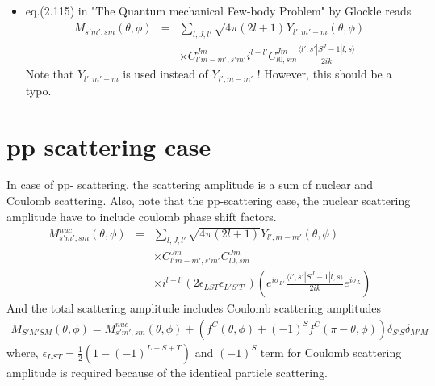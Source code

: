\documentclass[10pt]{book}
\newcommand{\bea}{\begin{eqnarray}}
\newcommand{\eea}{\end{eqnarray}}
\newcommand{\no}{\nonumber \\}
\def\la{\langle}
\def\ra{\rangle}
\begin{document}
\begin{itemize}
\item eq.(2.115) in "The Quantum mechanical Few-body Problem" by Glockle
      reads       
\bea
\label{MS:Glockle}
 M_{s'm',sm}(\theta,\phi)&=&\sum_{l,J,l'}\sqrt{4\pi(2l+1)} Y_{l',m'-m}(\theta,\phi)
              \no & &\times 
              C^{Jm}_{l' m-m', s' m'} i^{l-l'} C^{Jm}_{l0,sm}
              \frac{\la l',s'|S^J -1|l,s\ra}{2ik}
\eea           
 Note that $Y_{l',m'-m}$ is used instead of $Y_{l',m-m'}$ !
 However, this should be a typo.

       
\end{itemize}

\section{pp scattering case}
In case of pp- scattering, the scattering amplitude is a sum of nuclear and
Coulomb scattering.
Also, note that the pp-scattering case, the nuclear scattering amplitude have to
include coulomb phase shift factors. 
\bea 
M^{nuc}_{s'm',sm}(\theta,\phi)&=&
\sum_{l,J,l'}\sqrt{4\pi(2l+1)} Y_{l',m-m'}(\theta,\phi)
        \no & &\times 
        C^{Jm}_{l' m-m', s' m'} C^{Jm}_{l0,sm}
        \no & &\times 
        i^{l-l'}(2\epsilon_{LST}\epsilon_{L'S'T'})
        \left(e^{i\sigma_{L'}}\frac{\la l',s'|S^J -1|l,s\ra}{2ik}e^{i\sigma_{L}}\right) 
\eea
And the total scattering amplitude includes Coulomb scattering amplitudes
\bea 
M_{S'M'SM}(\theta,\phi)=M^{nuc}_{s'm',sm}(\theta,\phi)+
                        (f^{C}(\theta,\phi)+(-1)^{S}f^{C}(\pi-\theta,\phi))
                        \delta_{S'S}\delta_{M'M}
\eea 
where, $\epsilon_{LST}=\frac{1}{2}(1-(-1)^{L+S+T})$ and $(-1)^S$ term for Coulomb scattering
amplitude is required because of the identical particle scattering. 
\end{document}
